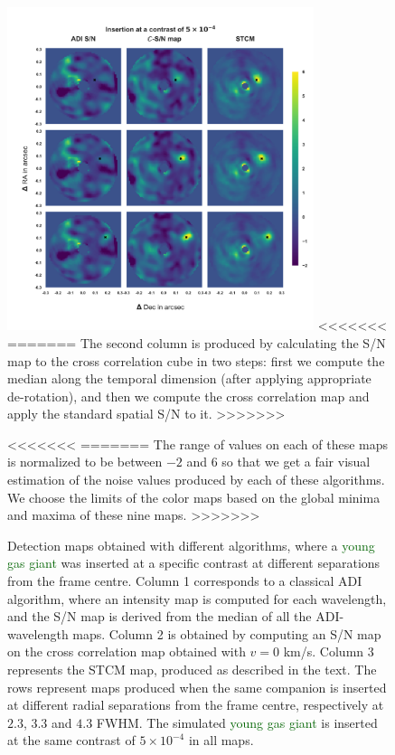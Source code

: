 \documentclass{aa}
\newcommand{\newchange}[1]{\textcolor{darkgreen}{#1}}
\begin{document}
{{\begin{figure}%
    \centering
    \includegraphics[width=0.8\textwidth]{Fig1_Dec_highres_noinbetween.png}
<<<<<<<
=======
The second column is produced by calculating the S/N map \citep[as defined in][]{2014Mawet} to the cross correlation cube in two steps: first we compute the median along the temporal dimension (after applying appropriate de-rotation), and then we compute the cross correlation map and apply the standard spatial S/N to it.
>>>>>>>
    \caption{Detection maps obtained with different algorithms, where a \newchange{young gas giant} was inserted at a specific contrast at different separations from the frame centre. Column 1 corresponds to a classical ADI algorithm, where an intensity map is computed for each wavelength, and the S/N map is derived from the median of all the ADI-wavelength maps. Column 2 is obtained by computing an S/N map on the cross correlation map obtained with $v=0$ km/s. Column 3 represents the STCM map, produced as described in the text. The rows represent maps produced when the same companion is inserted at different radial separations from the frame centre, respectively at $2.3$, $3.3$ and $4.3$ FWHM. %
    The simulated \newchange{young gas giant} is inserted at the same contrast of $5\times10^{-4}$ in all maps.}
<<<<<<<
=======
The range of values on each of these maps is normalized to be between $-2$ and $6$ so that we get a fair visual estimation of the noise values produced by each of these algorithms.
We choose the limits of the color maps based on the global minima and maxima of these nine maps.
>>>>>>>
    \label{fig:fig_1}
\end{figure}

}}
\end{document}

